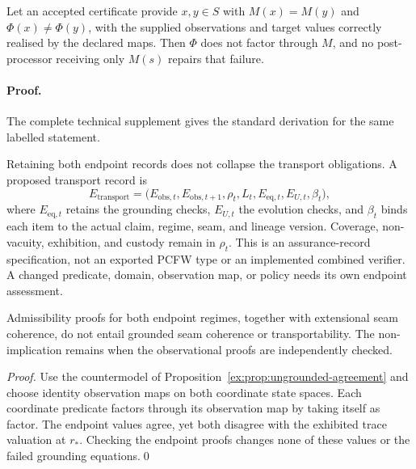 \documentclass[twocolumn,envcountsect,envcountsame,natbib]{svjour3}
\begin{document}
\begin{proposition}\label{ex:prop:pcfw-refutation}
Let an accepted certificate provide $x,y\in S$ with $M(x)=M(y)$ and $\Phi(x)\neq\Phi(y)$, with the supplied observations and target values correctly realised by the declared maps. Then $\Phi$ does not factor through $M$, and no post-processor receiving only $M(s)$ repairs that failure.
\end{proposition}
\paragraph{Proof.} The complete technical supplement gives the standard derivation for the same labelled statement.

Retaining both endpoint records does not collapse the transport obligations. A proposed transport record is
\begin{equation}\label{ex:eq:certificate-interface}
E_{\mathrm{transport}}=
\bigl(E_{\mathrm{obs},t},E_{\mathrm{obs},t+1},
\rho_t,L_t,E_{\mathrm{eq},t},E_{U,t},\beta_t\bigr),
\end{equation}
where $E_{\mathrm{eq},t}$ retains the grounding checks, $E_{U,t}$ the evolution checks, and $\beta_t$ binds each item to the actual claim, regime, seam, and lineage version. Coverage, non-vacuity, exhibition, and custody remain in $\rho_t$. This is an assurance-record specification, not an exported PCFW type or an implemented combined verifier. A changed predicate, domain, observation map, or policy needs its own endpoint assessment.

\begin{proposition}\label{ex:prop:observation-not-transport}
Admissibility proofs for both endpoint regimes, together with extensional seam coherence, do not entail grounded seam coherence or transportability. The non-implication remains when the observational proofs are independently checked.
\end{proposition}
\begin{proof}
Use the countermodel of Proposition~\ref{ex:prop:ungrounded-agreement} and choose identity observation maps on both coordinate state spaces. Each coordinate predicate factors through its observation map by taking itself as factor. The endpoint values agree, yet both disagree with the exhibited trace valuation at $r_*$. Checking the endpoint proofs changes none of these values or the failed grounding equations.\qed
\end{proof}
\end{document}

